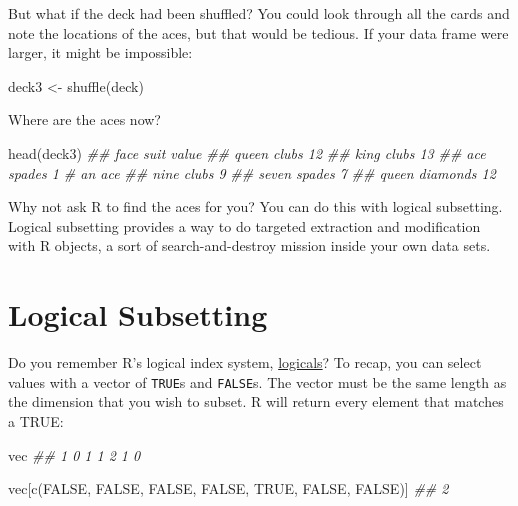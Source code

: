 \documentclass[
  letterpaper,
  DIV=11,
  numbers=noendperiod]{scrbook}
\newenvironment{Shaded}{\begin{snugshade}}{\end{snugshade}}
\newcommand{\ConstantTok}[1]{\textcolor[rgb]{0.56,0.35,0.01}{#1}}
\newcommand{\DocumentationTok}[1]{\textcolor[rgb]{0.37,0.37,0.37}{\textit{#1}}}
\newcommand{\FunctionTok}[1]{\textcolor[rgb]{0.28,0.35,0.67}{#1}}
\newcommand{\NormalTok}[1]{\textcolor[rgb]{0.00,0.23,0.31}{#1}}
\newcommand{\OtherTok}[1]{\textcolor[rgb]{0.00,0.23,0.31}{#1}}
\begin{document}
But what if the deck had been shuffled? You could look through all the
cards and note the locations of the aces, but that would be tedious. If
your data frame were larger, it might be impossible:

\begin{Shaded}
\begin{Highlighting}[]
\NormalTok{deck3 }\OtherTok{\textless{}{-}} \FunctionTok{shuffle}\NormalTok{(deck)}
\end{Highlighting}
\end{Shaded}

Where are the aces now?

\begin{Shaded}
\begin{Highlighting}[]
\FunctionTok{head}\NormalTok{(deck3)}
\DocumentationTok{\#\#  face     suit value}
\DocumentationTok{\#\# queen    clubs    12}
\DocumentationTok{\#\#  king    clubs    13}
\DocumentationTok{\#\#   ace   spades     1   \# an ace}
\DocumentationTok{\#\#  nine    clubs     9}
\DocumentationTok{\#\# seven   spades     7}
\DocumentationTok{\#\# queen diamonds    12}
\end{Highlighting}
\end{Shaded}

Why not ask R to find the aces for you? You can do this with logical
subsetting. Logical subsetting provides a way to do targeted extraction
and modification with R objects, a sort of search-and-destroy mission
inside your own data sets.

\section{Logical Subsetting}\label{logical-subsetting}

Do you remember R's logical index system,
\hyperref[sec-logicals]{logicals}? To recap, you can select values with
a vector of \texttt{TRUE}s and \texttt{FALSE}s. The vector must be the
same length as the dimension that you wish to subset. R will return
every element that matches a TRUE:

\begin{Shaded}
\begin{Highlighting}[]
\NormalTok{vec}
\DocumentationTok{\#\# 1 0 1 1 2 1 0}

\NormalTok{vec[}\FunctionTok{c}\NormalTok{(}\ConstantTok{FALSE}\NormalTok{, }\ConstantTok{FALSE}\NormalTok{, }\ConstantTok{FALSE}\NormalTok{, }\ConstantTok{FALSE}\NormalTok{, }\ConstantTok{TRUE}\NormalTok{, }\ConstantTok{FALSE}\NormalTok{, }\ConstantTok{FALSE}\NormalTok{)]}
\DocumentationTok{\#\# 2}
\end{Highlighting}
\end{Shaded}
\end{document}
